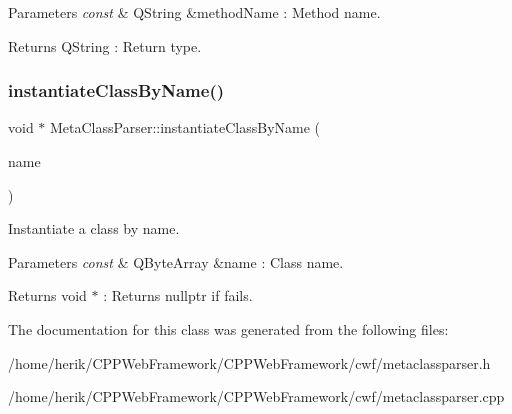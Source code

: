 \begin{DoxyParams}{Parameters}
{\em const} & Q\+String \&method\+Name \+: Method name. \\
\hline
\end{DoxyParams}
\begin{DoxyReturn}{Returns}
Q\+String \+: Return type. 
\end{DoxyReturn}
\mbox{\label{class_meta_class_parser_a1441f0bf6e0db301ea726279d535c49b}} 
\subsubsection{\texorpdfstring{instantiate\+Class\+By\+Name()}{instantiateClassByName()}}
{\footnotesize\ttfamily void $\ast$ Meta\+Class\+Parser\+::instantiate\+Class\+By\+Name (\begin{DoxyParamCaption}\item[{const Q\+Byte\+Array \&}]{name }\end{DoxyParamCaption})\hspace{0.3cm}{\ttfamily [static]}}



Instantiate a class by name. 


\begin{DoxyParams}{Parameters}
{\em const} & Q\+Byte\+Array \&name \+: Class name. \\
\hline
\end{DoxyParams}
\begin{DoxyReturn}{Returns}
void $\ast$ \+: Returns nullptr if fails. 
\end{DoxyReturn}


The documentation for this class was generated from the following files\+:\begin{DoxyCompactItemize}
\item 
/home/herik/\+C\+P\+P\+Web\+Framework/\+C\+P\+P\+Web\+Framework/cwf/metaclassparser.\+h\item 
/home/herik/\+C\+P\+P\+Web\+Framework/\+C\+P\+P\+Web\+Framework/cwf/metaclassparser.\+cpp\end{DoxyCompactItemize}
